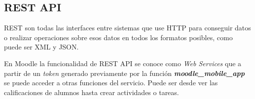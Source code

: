 \subsection{REST API}
REST\cite{noauthor_api_nodate} son todas las interfaces entre sistemas que use HTTP para conseguir datos o realizar operaciones sobre esos datos en todos los formatos posibles, como puede ser XML y JSON.

En Moodle la funcionalidad de REST API se conoce como \textit{Web Services} que a partir de un \textit{token} generado previamente por la función \textbf{\textit{moodle\_mobile\_app}} se puede acceder a otras funciones del servicio. Puede ser desde ver las calificaciones de alumnos hasta crear actividades o tareas.



